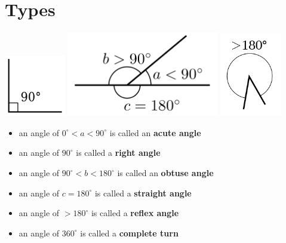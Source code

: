 \documentclass[12pt,a4paper]{article}
\begin{document}
\section{Types}
\includegraphics[width=0.2\textwidth]{right.png}
\includegraphics[width=0.5\textwidth]{angles.png}
\includegraphics[width=0.2\textwidth]{reflex.png}
\begin{itemize}
    \item an angle of \(0^\circ<a<90^\circ\) is called an {\bf acute angle}
    \item an angle of \(90^\circ\) is called a {\bf right angle}
    \item an angle of \(90^\circ<b<180^\circ\) is called an {\bf obtuse angle}
    \item an angle of \(c=180^\circ\) is called a {\bf straight angle}
    \item an angle of \(>180^\circ\) is called a {\bf reflex angle}
    \item an angle of \(360^\circ\) is called a {\bf complete turn}
\end{itemize}

\newpage
\end{document}
